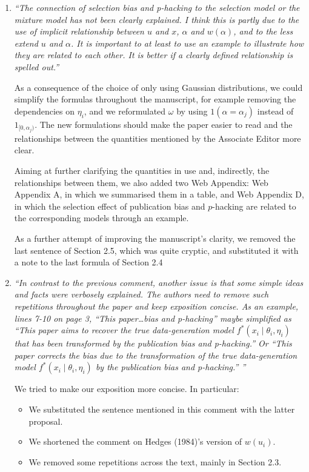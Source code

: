 \documentclass[11pt]{article}
\begin{document}
\begin{enumerate}

\item \emph{``The connection of selection bias and p-hacking to the selection model or the mixture model has not been clearly explained. I think this is partly due to the use of implicit relationship between $u$ and $x$, $\alpha$ and $w(\alpha)$, and to the less extend $u$ and $\alpha$. It is important to at least to use an example to illustrate how they are related to each other. It is better if a clearly defined relationship is spelled out.''}

As a consequence of the choice of only using Gaussian distributions, we could simplify the formulas throughout the manuscript, for example removing the dependencies on $\eta_i$, and we reformulated $\omega$ by using $1(\alpha = \alpha_j)$ instead of $1_{[0,\alpha_j)}$. The new formulations should make the paper easier to read and the relationships between the quantities mentioned by the Associate Editor more clear.

Aiming at further clarifying the quantities in use and, indirectly, the relationships between them, we also added two Web Appendix: Web Appendix A, in which we summarised them in a table, and Web Appendix D, in which the selection effect of publication bias and $p$-hacking are related to the corresponding models through an example. 

As a further attempt of improving the manuscript's clarity, we removed the last sentence of Section 2.5, which was quite cryptic, and substituted it with a note to the last formula of Section 2.4\\


\item \emph{``In contrast to the previous comment, another issue is that some simple ideas and facts were verbosely explained. The authors need to remove such repetitions throughout the paper and keep exposition concise. As an example, lines 7-10 on page 3, ``This paper\dots bias and p-hacking'' maybe simplified as ``This paper aims to recover the true data-generation model $f^*(x_i \mid \theta_i , \eta_i)$ that has been transformed by the publication bias and p-hacking.'' Or ``This paper corrects the bias due to the transformation of the true data-generation model $f^*(x_i \mid \theta_i , \eta_i )$ by the publication bias and p-hacking.'' ''}

We tried to make our exposition more concise. In particular:
\begin{itemize}
    \item We substituted the sentence mentioned in this comment with the latter proposal.
    \item We shortened the comment on Hedges (1984)'s version of $w(u_i)$.
    \item We removed some repetitions across the text, mainly in Section 2.3.
\end{itemize}
\vspace{11pt}


\end{enumerate}
\end{document}
